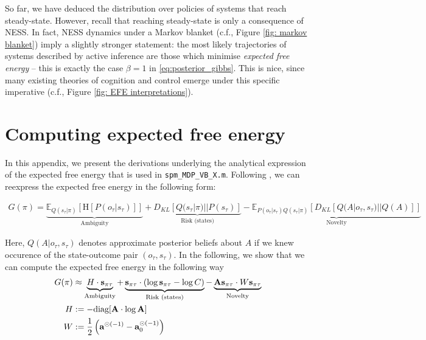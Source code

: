 \documentclass{article}
\begin{document}
So far, we have deduced the distribution over policies of systems that reach steady-state. However, recall that reaching steady-state is only a consequence of NESS. In fact, NESS dynamics under a Markov blanket (c.f., Figure \ref{fig: markov blanket}) imply a slightly stronger statement: the most likely trajectories of systems described by active inference are those which minimise \textit{expected free energy} \cite{parrMarkovBlanketsInformation2019,fristonFreeEnergyPrinciple2019} -- this is exactly the case $\beta =1$ in \eqref{eq:posterior_gibbs}. This is nice, since many existing theories of cognition and control emerge under this specific imperative (c.f., Figure \ref{fig: EFE interpretations}).

\section{Computing expected free energy}
	
	In this appendix, we present the derivations underlying the analytical expression of the expected free energy that is used in \texttt{spm\_MDP\_VB\_X.m}. Following \cite{parrComputationalNeurologyActive2019}, we can reexpress the expected free energy in the following form:
	
	\begin{multline}
	\label{eq: G new expression}
		G(\pi)= \underbrace{\mathbb E_{Q(s_\tau|\pi)} [\text{H}[P(o_\tau |s_\tau)]]}_{\text{Ambiguity}} + \underbrace{D_{KL}[Q(s_\tau |\pi)||P(s_\tau)]}_{\text{Risk (states)}}  
		- \underbrace{\mathbb E_{P(o_\tau |s_\tau)Q(s_\tau|\pi)}[D_{KL}[Q(A|o_\tau,s_\tau)||Q(A)]]}_{\text{Novelty}}
	\end{multline}
	
	 Here, $Q(A|o_\tau,s_\tau)$ denotes approximate posterior beliefs about $A$ if we knew occurence of the state-outcome pair $(o_\tau,s_\tau)$. In the following, we show that we can compute the expected free energy in the following way
	 \begin{equation}
	 \label{eq: sol efe computation}
	     \begin{split}
	         G(\pi) &\approx \underbrace{H \cdot \bold s_{\pi \tau}}_{\text{Ambiguity}} + \underbrace{ \bold s_{\pi \tau} \cdot (\log \bold s_{\pi \tau}-\log C)}_{\text{Risk (states)}} - \underbrace{\bold A \bold s_{\pi \tau} \cdot W \bold s_{\pi \tau}}_{\text{Novelty}} \\
             H &:= - \text{diag} [\bold A\cdot \log \bold A] \\
             W &:= \frac 1 2 \left(\bold a ^{\odot (-1)}-\bold a_0^{\odot (-1)}\right)
	     \end{split}
	 \end{equation}
    
\end{document}
